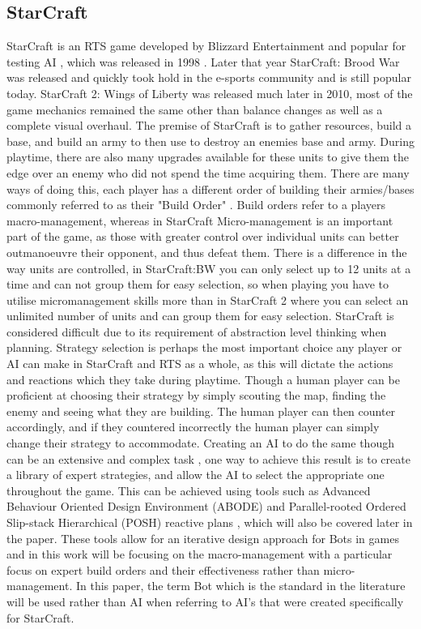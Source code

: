\documentclass[journal]{IEEEtran}
\begin{document}
	\subsection{StarCraft}
	StarCraft is an RTS game developed by Blizzard Entertainment \cite{Blizzard} and popular for testing AI \cite{Current}, which was released in 1998 \cite{Release}. Later that year StarCraft: Brood War was released and quickly took hold in the e-sports community and is still popular today. StarCraft 2: Wings of Liberty was released much later in 2010, most of the game mechanics remained the same other than balance changes as well as a complete visual overhaul. The premise of StarCraft is to gather resources, build a base, and build an army to then use to destroy an enemies base and army. During playtime, there are also many upgrades available for these units to give them the edge over an enemy who did not spend the time acquiring them. There are many ways of doing this, each player has a different order of building their armies/bases commonly referred to as their "Build Order" \cite{BuildOrder}. Build orders refer to a players macro-management, whereas in StarCraft Micro-management is an important part of the game, as those with greater control over individual units can better outmanoeuvre their opponent, and thus defeat them. There is a difference in the way units are controlled, in StarCraft:BW you can only select up to 12 units at a time and can not group them for easy selection, so when playing you have to utilise micromanagement skills more than in StarCraft 2 where you can select an unlimited number of units and can group them for easy selection.
	StarCraft is considered difficult due to its requirement of abstraction level thinking when planning. Strategy selection is perhaps the most important choice any player or AI can make in StarCraft and RTS as a whole, as this will dictate the actions and reactions which they take during playtime. Though a human player can be proficient at choosing their strategy by simply scouting the map, finding the enemy and seeing what they are building. The human player can then counter accordingly, and if they countered incorrectly the human player can simply change their strategy to accommodate. Creating an AI to do the same though can be an extensive and complex task \cite{Fuzzy,OnlineEvo,GoalDriven}, one way to achieve this result is to create a library of expert strategies, and allow the AI to select the appropriate one throughout the game. This can be achieved using tools such as Advanced Behaviour Oriented Design Environment (ABODE) and Parallel-rooted Ordered Slip-stack Hierarchical (POSH) reactive plans \cite{POSH}, which will also be covered later in the paper. These tools allow for an iterative design approach for Bots in games and in this work will be focusing on the macro-management with a particular focus on expert build orders and their effectiveness rather than micro-management. In this paper, the term Bot which is the standard in the literature will be used rather than AI when referring to AI's that were created specifically for StarCraft.
	
\end{document}
